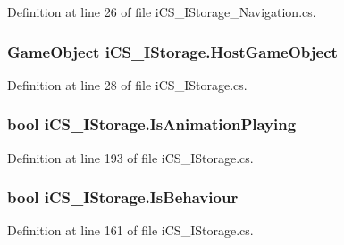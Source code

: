 Definition at line 26 of file i\+C\+S\+\_\+\+I\+Storage\+\_\+\+Navigation.\+cs.

\hypertarget{classi_c_s___i_storage_a113534f5ba28b9c3f8d3630f38c71483}{
\subsubsection[{Host\+Game\+Object}]{\setlength{\rightskip}{0pt plus 5cm}Game\+Object i\+C\+S\+\_\+\+I\+Storage.\+Host\+Game\+Object\hspace{0.3cm}{\ttfamily [get]}}}\label{classi_c_s___i_storage_a113534f5ba28b9c3f8d3630f38c71483}


Definition at line 28 of file i\+C\+S\+\_\+\+I\+Storage.\+cs.

\hypertarget{classi_c_s___i_storage_ad102c86ea0ff74d1d13810d3cb1a6bd8}{
\subsubsection[{Is\+Animation\+Playing}]{\setlength{\rightskip}{0pt plus 5cm}bool i\+C\+S\+\_\+\+I\+Storage.\+Is\+Animation\+Playing\hspace{0.3cm}{\ttfamily [get]}}}\label{classi_c_s___i_storage_ad102c86ea0ff74d1d13810d3cb1a6bd8}


Definition at line 193 of file i\+C\+S\+\_\+\+I\+Storage.\+cs.

\hypertarget{classi_c_s___i_storage_ae13503bb1bdbaaa7ea69c9ff17617ab7}{
\subsubsection[{Is\+Behaviour}]{\setlength{\rightskip}{0pt plus 5cm}bool i\+C\+S\+\_\+\+I\+Storage.\+Is\+Behaviour\hspace{0.3cm}{\ttfamily [get]}}}\label{classi_c_s___i_storage_ae13503bb1bdbaaa7ea69c9ff17617ab7}


Definition at line 161 of file i\+C\+S\+\_\+\+I\+Storage.\+cs.


